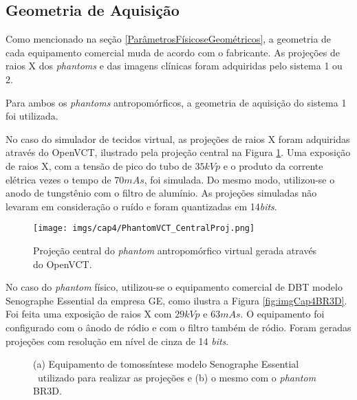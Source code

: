 \subsection{Geometria de Aquisição} 


Como mencionado na seção \ref{ParâmetrosFísicoseGeométricos}, a geometria de cada equipamento comercial muda de acordo com o fabricante. As projeções de raios X dos \textit{phantoms} e das imagens clínicas foram adquiridas pelo sistema 1 ou 2. 

Para ambos os \textit{phantoms} antropomórficos, a geometria de aquisição do sistema 1 foi utilizada. 

No caso do simulador de tecidos virtual, as projeções de raios X foram adquiridas através do OpenVCT, ilustrado pela projeção central na Figura \ref{fig:imgCap4PhantomVCT_CentralProj}. Uma exposição de raios X, com a tensão de pico do tubo de $35kVp$ e o produto da corrente elétrica vezes o tempo de $70mAs$, foi simulada. Do mesmo modo, utilizou-se o anodo de tungstênio com o filtro de alumínio. As projeções simuladas não levaram em consideração o ruído e foram quantizadas em 14\textit{bits}.

\begin{figure}[H]
	\caption{Projeção central do \textit{phantom} antropomórfico virtual gerada através do OpenVCT.}
	\begin{center}
		\texttt{[image: imgs/cap4/PhantomVCT\_CentralProj.png]}
	\end{center}
	\label{fig:imgCap4PhantomVCT_CentralProj}
\end{figure} 

No caso do \textit{phantom} físico, utilizou-se  o equipamento comercial de \acs{DBT} modelo Senographe Essential{\footnotesize \texttrademark} \space da empresa \acs{GE}, como ilustra a Figura \ref{fig:imgCap4BR3D}. Foi feita uma exposição de raios X com $29kVp$ e $63mAs$. O equipamento foi configurado com o ânodo de ródio e com o filtro também de ródio. Foram geradas projeções com resolução em nível de cinza de 14 \textit{bits}.

\begin{figure}[H]
	\centering
	
	\caption{(a) Equipamento de tomossíntese modelo Senographe Essential{\footnotesize \texttrademark} \ utilizado para realizar as projeções e (b) o mesmo com o \textit{phantom} BR3D.}
	
	\hfil
	
	\label{fig:imgCap4EquipamentoGE}
\end{figure} 

